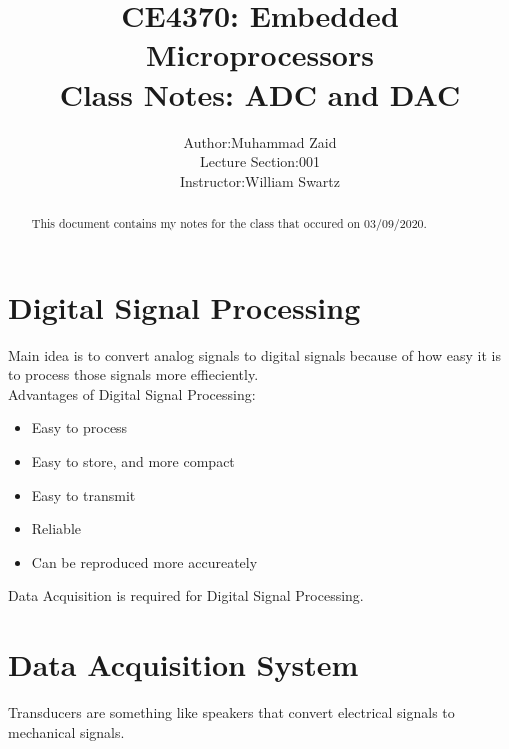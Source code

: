 \documentclass{article}
\title{%
  CE4370: Embedded Microprocessors \\
  \large {Class Notes: ADC and DAC}\\
  }
\author{\begin{tabular}{r@{ }l} 
Author:      & Muhammad Zaid \\[1ex] 
Lecture Section:    & 001 \\
Instructor: &William Swartz
\end{tabular}}
\begin{document}
\maketitle
\vfill{}
\begin{abstract}
\noindent This document contains my notes for the class that occured on 03/09/2020.\\
\end{abstract}

\newpage

\section{Digital Signal Processing}
Main idea is to convert analog signals to digital signals because of how easy it is to process those signals more effieciently.\\

Advantages of Digital Signal Processing:
\begin{itemize}
    \item Easy to process
    \item Easy to store, and more compact
    \item Easy to transmit
    \item Reliable
    \item Can be reproduced more accureately
\end{itemize}

Data Acquisition is required for Digital Signal Processing.\\

\section{Data Acquisition System}
Transducers are something like speakers that convert electrical signals to mechanical signals.\\
\end{document}

